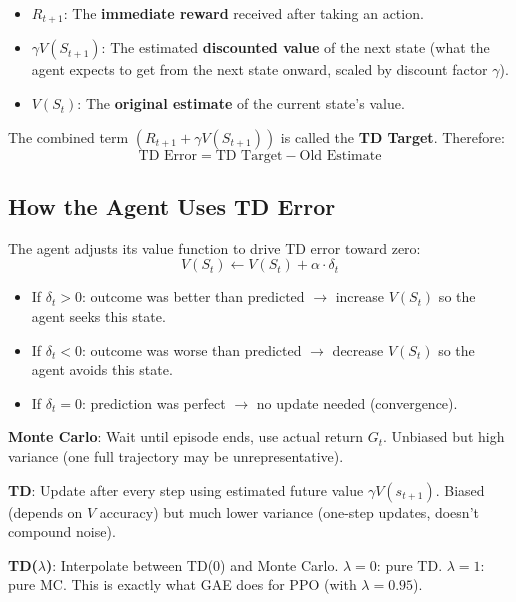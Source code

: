 \begin{itemize}
  \item $R_{t+1}$: The \textbf{immediate reward} received after taking an action.
  \item $\gamma V(S_{t+1})$: The estimated \textbf{discounted value} of the next state (what the agent expects to get from the next state onward, scaled by discount factor $\gamma$).
  \item $V(S_t)$: The \textbf{original estimate} of the current state’s value.
\end{itemize}

The combined term $(R_{t+1} + \gamma V(S_{t+1}))$ is called the \textbf{TD Target}. Therefore: 
\begin{equation}
\text{TD Error} = \text{TD Target} - \text{Old Estimate}
\end{equation}

\subsection{How the Agent Uses TD Error}
\label{how-the-agent-uses-td-error}

The agent adjusts its value function to drive TD error toward zero: 
\begin{equation}
\boxed{V(S_t) \leftarrow V(S_t) + \alpha \cdot \delta_t}
\end{equation}

\begin{itemize}
  \item If $\delta_t > 0$: outcome was better than predicted $\rightarrow$ increase $V(S_t)$ so the agent seeks this state.
  \item If $\delta_t < 0$: outcome was worse than predicted $\rightarrow$ decrease $V(S_t)$ so the agent avoids this state.
  \item If $\delta_t = 0$: prediction was perfect $\rightarrow$ no update needed (convergence).
\end{itemize}

\begin{intuitionbox}
\textbf{Monte Carlo}: Wait until episode ends, use actual return $G_t$. Unbiased but high variance (one full trajectory may be unrepresentative).

\textbf{TD}: Update after every step using estimated future value $\gamma V(s_{t+1})$. Biased (depends on $V$ accuracy) but much lower variance (one-step updates, doesn’t compound noise).

\textbf{TD($\lambda$)}: Interpolate between TD(0) and Monte Carlo. $\lambda=0$: pure TD. $\lambda=1$: pure MC. This is exactly what GAE does for PPO (with $\lambda=0.95$).
\end{intuitionbox}

